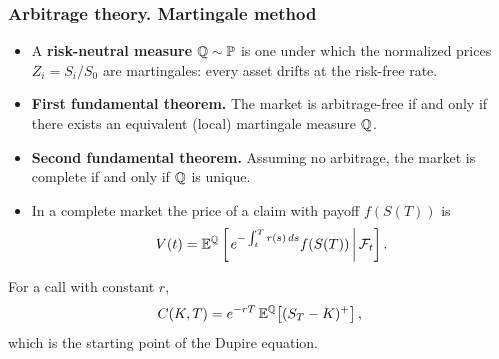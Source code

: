 \begin{frame}
\frametitle{Arbitrage theory. Martingale method}
\begin{scriptsize}
\begin{itemize}
\item A \textbf{risk-neutral measure} $\mathbb{Q} \sim \mathbb{P}$ is one under which the normalized prices
$Z_i = S_i / S_0$ are martingales: every asset drifts at the risk-free rate.

\item \textbf{First fundamental theorem.}
The market is arbitrage-free if and only if there exists an equivalent (local) martingale measure $\mathbb{Q}$.

\item \textbf{Second fundamental theorem.}
Assuming no arbitrage, the market is complete if and only if $\mathbb{Q}$ is unique.

\item In a complete market the price of a claim with payoff $f(S(T))$ is
\begin{equation*}
    V(t) = \mathbb{E}^{\mathbb{Q}} \left[ \left. e^{ - \int^T_t r(s)\, ds} f(S(T)) \,\right| \mathcal{F}_t \right].
\end{equation*}
\end{itemize}
\medskip
For a call with constant $r$,
\begin{equation*}
    C(K, T) = e^{-rT}\, \mathbb{E}^{\mathbb{Q}}\!\left[(S_T - K)^+\right],
\end{equation*}
which is the starting point of the Dupire equation.
\end{scriptsize}
\end{frame}
